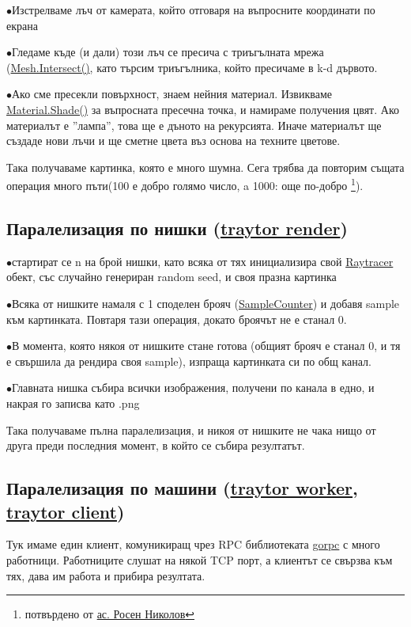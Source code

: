 \documentclass[12pt]{extarticle}
\newlength{\bulletwidth}\settowidth{\bulletwidth}{$\bullet$}
\newcommand{\mitem}{\vspace{5mm}\setlength{\leftskip}{\leftmargin}\hspace*{-\labelsep}\hspace*{-\bulletwidth}$\bullet$\hspace*{\labelsep}}
\newcommand{\mend}{\setlength{\leftskip}{0cm}\vspace{5mm}}
\begin{document}
	\mitem Изстрелваме лъч от камерата, който отговаря на въпросните
	координати по екрана
	
	\mitem Гледаме къде (и дали) този лъч се пресича с триъгълната
	мрежа (\href{https://godoc.org/github.com/DexterLB/traytor/mesh#Mesh.Intersect}{Mesh.Intersect()}, като търсим триъгълника,
	който пресичаме в k-d дървото.
	
	\mitem Ако сме пресекли повърхност, знаем нейния материал.
	Извикваме \href{https://godoc.org/github.com/DexterLB/traytor/materials#Material}{Material.Shade()} за въпросната пресечна точка,
	и намираме получения цвят. Ако материалът е ''лампа'', това ще
	е дъното на рекурсията. Иначе материалът ще създаде нови лъчи
	и ще сметне цвета въз основа на техните цветове.

	\mend

Така получаваме картинка, която е много шумна. Сега трябва да повторим
същата операция много  пъти(100 е добро голямо число, a 1000: още по-добро \footnote{потвърдено от \href{https://www.fmi.uni-sofia.bg/bg/lecturers/ma/rnikolov}{ас. Росен Николов}}).

\subsection{Паралелизация по нишки (\href{https://github.com/DexterLB/traytor/blob/master/cmd/traytor/render.go}{traytor render})}

	\mitem стартират се n на брой нишки, като всяка
от тях инициализира свой \href{https://godoc.org/github.com/DexterLB/traytor/raytracer#Raytracer}{Raytracer} обект, със случайно генериран
random seed, и своя празна картинка

	\mitem Всяка от нишките намаля с 1 споделен брояч (\href{https://godoc.org/github.com/DexterLB/traytor/rpc#SampleCounter}{SampleCounter}) и добавя sample към картинката. Повтаря тази
	операция, докато броячът не е станал 0.
	
	\mitem В момента, която някоя от нишките стане готова (общият
	брояч е станал 0, и тя е свършила да рендира своя sample),
	изпраща картинката си по общ канал.
	
	\mitem Главната нишка събира всички изображения, получени по
	канала в едно, и накрая го записва като .png
	
	\mend
	
Така получаваме пълна паралелизация, и никоя от нишките не чака нищо
от друга преди последния момент, в който се събира резултатът.

\pagebreak
\subsection{Паралелизация по машини (\href{https://github.com/DexterLB/traytor/blob/master/cmd/traytor/worker.go}{traytor worker}, \href{https://github.com/DexterLB/traytor/blob/master/cmd/traytor/client.go}{traytor client})}
Тук имаме един клиент, комуникиращ чрез RPC библиотеката \href{https://godoc.org/github.com/valyala/gorpc}{gorpc} с много работници. Работниците слушат на някой TCP порт, а клиентът се 
свързва към тях, дава им работа и прибира резултата.
\end{document}
